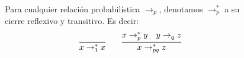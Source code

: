 \begin{figure}[H]
\begin{definicion}[$\rightarrow_p^*$]
Para cualquier relación probabilística $\rightarrow_p$, denotamos $\rightarrow_p^*$ a su cierre reflexivo y transitivo. Es decir:
 \[\arraycolsep=10pt\def\arraystretch{2.6}
   \begin{array}{cc}
    \infer
     {x \rightarrow_1^* x}
     {}
     &
     \infer
     {x \rightarrow_{pq}^* z}
     {x \rightarrow_p^* y \quad y \rightarrow_q z}
   \end{array}
 \]
\end{definicion}
\end{figure}





